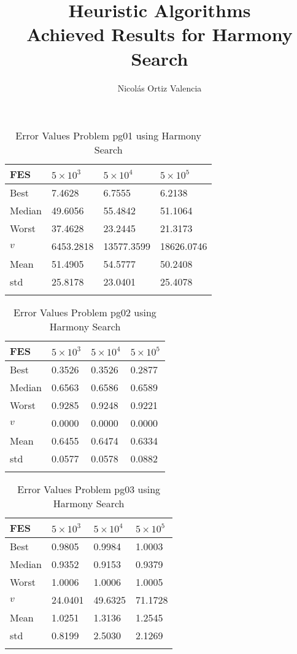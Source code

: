 \documentclass[10pt, a4paper]{book}
\title{
    Heuristic Algorithms \\
    \large Achieved Results for Harmony Search\\
}
\author{Nicolás Ortiz Valencia}
\begin{document}
\maketitle


\begin{center}
\begin{longtable}{l l l l}
FES & $5 \times 10^{3}$ & $5 \times 10^{4}$ & $5 \times 10^{5}$ \\
\hline
Best & 7.4628 & 6.7555 & 6.2138 \\
Median & 49.6056 & 55.4842 & 51.1064 \\
Worst & 37.4628 & 23.2445 & 21.3173 \\
$v$ & 6453.2818 & 13577.3599 & 18626.0746 \\
Mean & 51.4905 & 54.5777 & 50.2408 \\
std & 25.8178 & 23.0401 & 25.4078 \\
\caption{ Error Values Problem pg01 using Harmony Search }
\end{longtable}
\end{center}

\begin{center}
\begin{longtable}{l l l l}
FES & $5 \times 10^{3}$ & $5 \times 10^{4}$ & $5 \times 10^{5}$ \\
\hline
Best & 0.3526 & 0.3526 & 0.2877 \\
Median & 0.6563 & 0.6586 & 0.6589 \\
Worst & 0.9285 & 0.9248 & 0.9221 \\
$v$ & 0.0000 & 0.0000 & 0.0000 \\
Mean & 0.6455 & 0.6474 & 0.6334 \\
std & 0.0577 & 0.0578 & 0.0882 \\
\caption{ Error Values Problem pg02 using Harmony Search }
\end{longtable}
\end{center}

\begin{center}
\begin{longtable}{l l l l}
FES & $5 \times 10^{3}$ & $5 \times 10^{4}$ & $5 \times 10^{5}$ \\
\hline
Best & 0.9805 & 0.9984 & 1.0003 \\
Median & 0.9352 & 0.9153 & 0.9379 \\
Worst & 1.0006 & 1.0006 & 1.0005 \\
$v$ & 24.0401 & 49.6325 & 71.1728 \\
Mean & 1.0251 & 1.3136 & 1.2545 \\
std & 0.8199 & 2.5030 & 2.1269 \\
\caption{ Error Values Problem pg03 using Harmony Search }
\end{longtable}
\end{center}
\end{document}
